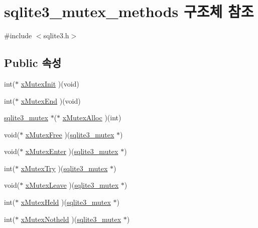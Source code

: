 \hypertarget{structsqlite3__mutex__methods}{}\section{sqlite3\+\_\+mutex\+\_\+methods 구조체 참조}
\label{structsqlite3__mutex__methods}


{\ttfamily \#include $<$sqlite3.\+h$>$}

\subsection*{Public 속성}
\begin{DoxyCompactItemize}
\item 
int($\ast$ \hyperlink{structsqlite3__mutex__methods_a1a163f0e0eaed85223b1537434df635a}{x\+Mutex\+Init} )(void)
\item 
int($\ast$ \hyperlink{structsqlite3__mutex__methods_ab3bc5e370edbeb1db4199d5f609fb09f}{x\+Mutex\+End} )(void)
\item 
\hyperlink{sqlite3_8h_a0f546860bde03fddb33a9fed920da05c}{sqlite3\+\_\+mutex} $\ast$($\ast$ \hyperlink{structsqlite3__mutex__methods_a1c6c36e7f710a5bb8564946595cba324}{x\+Mutex\+Alloc} )(int)
\item 
void($\ast$ \hyperlink{structsqlite3__mutex__methods_a632046a2d4a6372a567a5ac5e8175b30}{x\+Mutex\+Free} )(\hyperlink{sqlite3_8h_a0f546860bde03fddb33a9fed920da05c}{sqlite3\+\_\+mutex} $\ast$)
\item 
void($\ast$ \hyperlink{structsqlite3__mutex__methods_a0237ae1928c2edab7be16e9e007f6a02}{x\+Mutex\+Enter} )(\hyperlink{sqlite3_8h_a0f546860bde03fddb33a9fed920da05c}{sqlite3\+\_\+mutex} $\ast$)
\item 
int($\ast$ \hyperlink{structsqlite3__mutex__methods_aa65a38cee32246dc3257a80ce47be5fe}{x\+Mutex\+Try} )(\hyperlink{sqlite3_8h_a0f546860bde03fddb33a9fed920da05c}{sqlite3\+\_\+mutex} $\ast$)
\item 
void($\ast$ \hyperlink{structsqlite3__mutex__methods_a0d4ef78481d18de5f9346f80321a17b1}{x\+Mutex\+Leave} )(\hyperlink{sqlite3_8h_a0f546860bde03fddb33a9fed920da05c}{sqlite3\+\_\+mutex} $\ast$)
\item 
int($\ast$ \hyperlink{structsqlite3__mutex__methods_a71a26118133388426ddf18ab59ce87f5}{x\+Mutex\+Held} )(\hyperlink{sqlite3_8h_a0f546860bde03fddb33a9fed920da05c}{sqlite3\+\_\+mutex} $\ast$)
\item 
int($\ast$ \hyperlink{structsqlite3__mutex__methods_a5b7c9daa7aea5f01ef9fa58f6d1c5cb1}{x\+Mutex\+Notheld} )(\hyperlink{sqlite3_8h_a0f546860bde03fddb33a9fed920da05c}{sqlite3\+\_\+mutex} $\ast$)
\end{DoxyCompactItemize}


